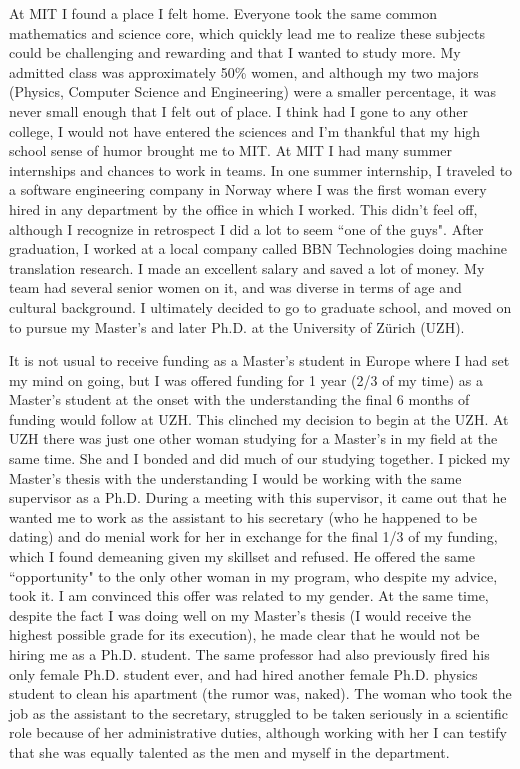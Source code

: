 \documentclass[utf8]{frontiersSCNS} %
\begin{document}
At MIT I found a place I felt home. Everyone took the same common mathematics and science core, which quickly lead me to realize these subjects could be challenging and rewarding and that I wanted to study more.  My admitted class was approximately 50\% women, and although my two majors (Physics, Computer Science and Engineering) were a smaller percentage, it was never small enough that I felt out of place. I think had I gone to any other college, I would not have entered the sciences and I'm thankful that my high school sense of humor brought me to MIT. At MIT I had many summer internships and chances to work in teams. In one summer internship, I traveled to a software engineering company in Norway where I was the first woman every hired in any department by the office in which I worked. This didn't feel off, although I recognize in retrospect I did a lot to seem ``one of the guys". After graduation, I worked at a local company called BBN Technologies doing machine translation research. I made an excellent salary and saved a lot of money. My team had several senior women on it, and was diverse in terms of age and cultural background. I ultimately decided to go to graduate school, and moved on to pursue my Master's and later Ph.D. at the University of Z\"urich (UZH).

It is not usual to receive funding as a Master's student in Europe where I had set my mind on going, but I was offered funding for 1 year (2/3 of my time) as a Master's student at the onset with the understanding the final 6 months of funding would follow at UZH. This clinched my decision to begin at the UZH. At UZH there was just one other woman studying for a Master's in my field at the same time. She and I bonded and did much of our studying together. I picked my Master's thesis with the understanding I would be working with the same supervisor as a Ph.D. During a meeting with this supervisor, it came out that he wanted me to work as the assistant to his secretary (who he happened to be dating) and do menial work for her in exchange for the final 1/3 of my funding, which I found demeaning given my skillset and refused. He offered the same ``opportunity" to the only other woman in my program, who despite my advice, took it. I am convinced this offer was related to my gender. At the same time, despite the fact I was doing well on my Master's thesis (I would receive the highest possible grade for its execution), he made clear that he would not be hiring me as a Ph.D. student. The same professor had also previously fired his only female Ph.D. student ever, and had hired another female Ph.D. physics student to clean his apartment (the rumor was, naked). The woman who took the job as the assistant to the secretary, struggled to be taken seriously in a scientific role because of her administrative duties, although working with her I can testify that she was equally talented as the men and myself in the department.
\end{document}
